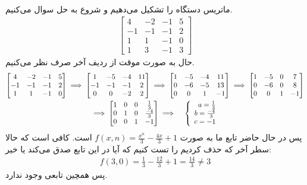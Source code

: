 \\
ماتریس دستگاه را تشکیل می‌دهیم و شروع به حل سوال می‌کنیم.
\begin{gather*}
    \begin{bmatrix}
        4 & -2 & -1 & 5 \\
        -1 & -1 & -1 & 2 \\
        1 & 1 & -1 & 0 \\
        1 & 3 & -1 & 3
    \end{bmatrix}
\end{gather*}
حال به صورت موقت از ردیف آخر صرف نظر می‌کنیم.
\begin{gather*}
    \begin{bmatrix}
        4 & -2 & -1 & 5 \\
        -1 & -1 & -1 & 2 \\
        1 & 1 & -1 & 0
    \end{bmatrix}
    \implies
    \begin{bmatrix}
        1 & -5 & -4 & 11 \\
        -1 & -1 & -1 & 2 \\
        0 & 0 & -2 & 2
    \end{bmatrix}
    \implies
    \begin{bmatrix}
        1 & -5 & -4 & 11 \\
        0 & -6 & -5 & 13 \\
        0 & 0 & 1 & -1
    \end{bmatrix}
    \implies
    \begin{bmatrix}
        1 & -5 & 0 & 7 \\
        0 & -6 & 0 & 8 \\
        0 & 0 & 1 & -1
    \end{bmatrix}\\
    \implies
    \begin{bmatrix}
        1 & 0 & 0 & \frac{1}{3} \\
        0 & 1 & 0 & \frac{-4}{3} \\
        0 & 0 & 1 & -1
    \end{bmatrix}
    \implies \quad
    \left\{\begin{array}{r@{\mskip\thickmuskip}l}
        a = \frac{1}{3} \\
        b = \frac{-4}{3} \\
        c = -1
    \end{array}\right.
\end{gather*}
پس در حال حاضر تابع ما به صورت
$f(x,n) = \frac{x^n}{3}-\frac{4x}{3}+1$
است. کافی است که حالا سطر آخر که حذف کردیم را تست کنیم که آیا در این تابع صدق می‌کند یا خیر:
\begin{gather*}
    f(3,0) = \frac{1}{3}-\frac{12}{3}+1=\frac{14}{3} \neq 3
\end{gather*}
پس همچین تابعی وجود ندارد.
